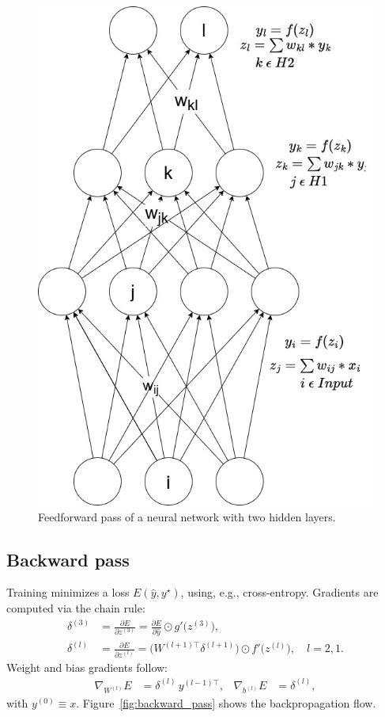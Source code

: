 \begin{figure}[ht]
    \centering 
    \includegraphics[width=0.6\linewidth]{figures/neural_net.jpg}
    \caption{Feedforward pass of a neural network with two hidden layers.} 
    \label{fig:forward_pass}
\end{figure}

\subsection{Backward pass}
Training minimizes a loss \(E(\hat y, y^\star)\), using, e.g., cross-entropy. Gradients are computed via the chain rule:
\begin{align}
\delta^{(3)} &= \frac{\partial E}{\partial z^{(3)}}
= \frac{\partial E}{\partial \hat y}\odot g'\bigl(z^{(3)}\bigr),\\
\delta^{(l)} &= \frac{\partial E}{\partial z^{(l)}}
= \bigl(W^{(l+1)\top}\delta^{(l+1)}\bigr)\odot f'\bigl(z^{(l)}\bigr),
\quad l=2,1.
\end{align}
Weight and bias gradients follow:
\begin{align}
\nabla_{W^{(l)}}E &= \delta^{(l)}\,y^{(l-1)\top}, &
\nabla_{b^{(l)}}E &= \delta^{(l)},
\end{align}
with \(y^{(0)}\equiv x\). Figure~\ref{fig:backward_pass} shows the backpropagation flow.


